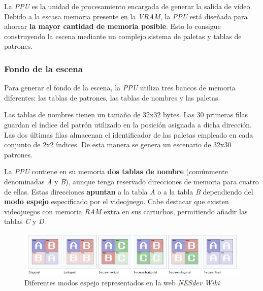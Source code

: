 La \textit{PPU}\cite{PPU} es la unidad de procesamiento encargada de generar
la salida de vídeo.
Debido a la escasa memoria presente en la \textit{VRAM}, la \textit{PPU}
está diseñada para ahorrar \textbf{la mayor cantidad de memoria posible}.
Esto lo consigue construyendo la escena mediante un complejo
sistema de paletas y tablas de patrones.

\subsubsection{Fondo de la escena}\label{subsubsec:fondo-de-la-escena}

Para generar el fondo de la escena, la \textit{PPU} utiliza
tres bancos de memoria diferentes: las tablas de patrones\cite{PATTERN_TABLES},
las tablas de nombres\cite{NAME_TABLES} y las paletas\cite{PALETTES}.

Las tablas de nombres tienen un tamaño de 32x32 bytes.
Las 30 primeras filas guardan el índice del patrón
utilizado en la posición asignada a dicha dirección.
Las dos últimas filas almacenan el identificador de las
paletas empleado en cada conjunto de 2x2 índices.
De esta manera se genera un escenario de 32x30 patrones.

La \textit{PPU} contiene en su memoria \textbf{dos tablas de nombre}
(comúnmente denominadas \textit{A} y \textit{B}),
aunque tenga reservado direcciones de memoria para cuatro de ellas.
Estas direcciones \textbf{apuntan} a la tabla
\textit{A} o a la tabla \textit{B} dependiendo
del \textbf{modo espejo}\cite{MIRRORING} especificado por el videojuego.
Cabe destacar que existen videojuegos con memoria \textit{RAM}
extra en sus cartuchos, permitiendo añadir las tablas \textit{C} y \textit{D}.

\begin{figure}[h]
    \centering
    \includegraphics[width=\textwidth]{images/nes/nes-mirroring}
    \caption{Diferentes modos espejo representados en la web \textit{NESdev Wiki}}
    \label{fig:nes-mirroring}
\end{figure}

